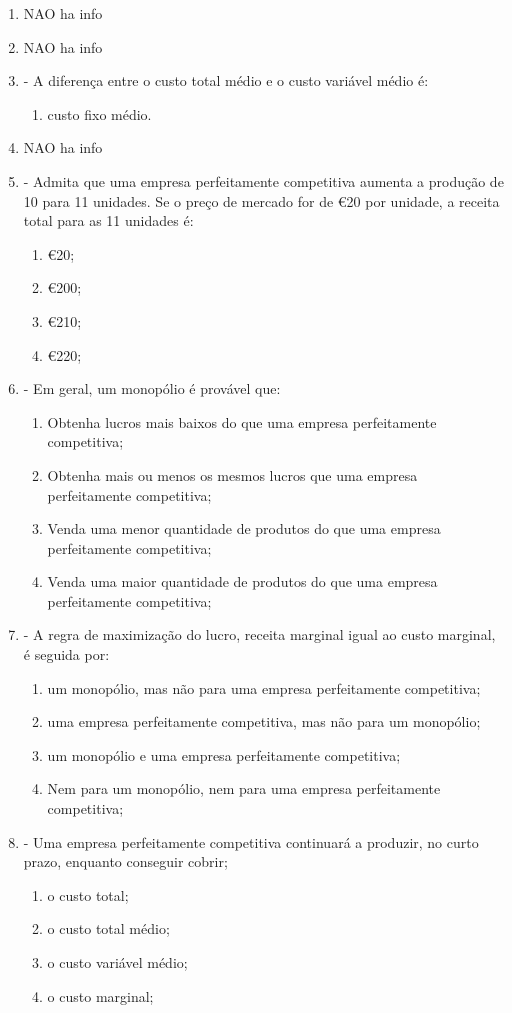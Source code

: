 \documentclass[11pt]{article}
\begin{document}
\begin{enumerate}
\item NAO ha info

\item NAO ha info

\item - A diferença entre o custo total médio e o custo variável médio é: 
\begin{enumerate}
\item custo fixo médio.
\end{enumerate}

\item NAO ha info

\clearpage
\item - Admita que uma empresa perfeitamente competitiva aumenta a produção de 10 para 11 unidades. Se o preço de mercado for de €20 por unidade, a receita total para as 11 unidades é: 
\begin{enumerate}
\item €20;
\item €200;
\item €210;
\item €220;
\end{enumerate}

\item - Em geral, um monopólio é provável que: 
\begin{enumerate}
\item Obtenha lucros mais baixos do que uma empresa perfeitamente competitiva;
\item Obtenha mais ou menos os mesmos lucros que uma empresa perfeitamente competitiva;
\item Venda uma menor quantidade de produtos do que uma empresa perfeitamente competitiva;
\item Venda uma maior quantidade de produtos do que uma empresa perfeitamente competitiva;
\end{enumerate}

\item - A regra de maximização do lucro, receita marginal igual ao custo marginal, é seguida por: 
\begin{enumerate}
\item um monopólio, mas não para uma empresa perfeitamente competitiva;
\item uma empresa perfeitamente competitiva, mas não para um monopólio;
\item um monopólio e uma empresa perfeitamente competitiva;
\item Nem para um monopólio, nem para uma empresa perfeitamente competitiva;
\end{enumerate}

\item - Uma empresa perfeitamente competitiva continuará a produzir, no curto prazo, enquanto conseguir cobrir; 
\begin{enumerate}
\item o custo total;
\item o custo total médio;
\item o custo variável médio;
\item o custo marginal;
\end{enumerate}
\end{enumerate}
\end{document}
